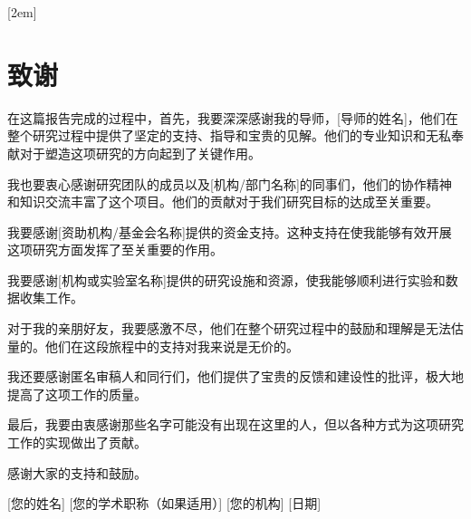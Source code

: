 
[2em]{\vspace{.5\baselineskip}\xiaosan\song}
             {\prechaptername\CJKnumber{\thecontentslabel}\postchaptername\qquad}{} 
             {}                            %
\lhead{}
\rhead{}
\lfoot{}
\cfoot{}
\rfoot{}
\chapter*{致\quad 谢}
\setcounter{page}{1}

在这篇报告完成的过程中，首先，我要深深感谢我的导师，[导师的姓名]，他们在整个研究过程中提供了坚定的支持、指导和宝贵的见解。他们的专业知识和无私奉献对于塑造这项研究的方向起到了关键作用。

我也要衷心感谢研究团队的成员以及[机构/部门名称]的同事们，他们的协作精神和知识交流丰富了这个项目。他们的贡献对于我们研究目标的达成至关重要。

我要感谢[资助机构/基金会名称]提供的资金支持。这种支持在使我能够有效开展这项研究方面发挥了至关重要的作用。

我要感谢[机构或实验室名称]提供的研究设施和资源，使我能够顺利进行实验和数据收集工作。

对于我的亲朋好友，我要感激不尽，他们在整个研究过程中的鼓励和理解是无法估量的。他们在这段旅程中的支持对我来说是无价的。

我还要感谢匿名审稿人和同行们，他们提供了宝贵的反馈和建设性的批评，极大地提高了这项工作的质量。

最后，我要由衷感谢那些名字可能没有出现在这里的人，但以各种方式为这项研究工作的实现做出了贡献。

感谢大家的支持和鼓励。

[您的姓名]
[您的学术职称（如果适用）]
[您的机构]
[日期]





